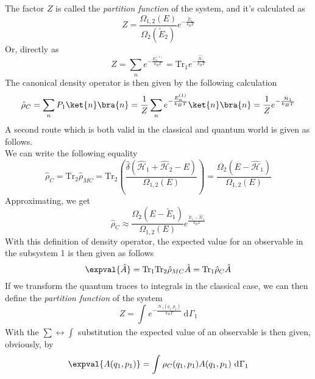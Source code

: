 \documentclass[a4paper, 11pt]{book}
\renewcommand{\trace}{\mathrm{Tr}}
\newcommand{\1}{\opr{\mathds{1}}}
\newcommand{\diff}[2][]{\ \mathrm{d}^{#1}#2}
\newcommand{\ham}{\mathcal{H}}
\newcommand{\opr}[1]{\hat{#1}}
\newcommand{\dopr}{\hat{\rho}}
\theoremstyle{plain}
\begin{document}
		The factor $Z$ is called the \textit{partition function} of the system, and it's calculated as
		\begin{equation*}
			Z=\frac{\Omega_{1,2}(E)}{\Omega_2(\tilde{E}_2)}e^{-\frac{\tilde{E}_1}{k_BT}}
		\end{equation*}
		Or, directly as
		\begin{equation}
			Z=\sum_ne^{-\frac{E_n^{(1)}}{k_BT}}=\trace_1e^{-\frac{\opr{\ham}_1}{k_BT}}
			\label{eq:canonicalpartitionfunction}
		\end{equation}
		The canonical density operator is then given by the following calculation
		\begin{equation}
			\dopr_C=\sum_nP_1\ket{n}\bra{n}=\frac{1}{Z}\sum_ne^{-\frac{E_n^{(1)}}{k_BT}}\ket{n}\bra{n}=\frac{1}{Z}e^{-\frac{\opr{\ham}_1}{k_BT}}
			\label{eq:canonicaldensityoperator}
		\end{equation}
		A second route which is both valid in the classical and quantum world is given as follows.\\
		We can write the following equality
		\begin{equation}
			\dopr_C=\trace_2\dopr_{MC}=\trace_2\left( \frac{\opr{\delta}\left( \opr{\ham}_1+\opr{\ham}_2-E \right)}{\Omega_{1,2}(E)} \right)=\frac{\Omega_2(E-\opr{\ham}_1)}{\Omega_{1,2}(E)}
			\label{eq:canonicaloperator}
		\end{equation}
		Approximating, we get
		\begin{equation}
			\dopr_C\approx\frac{\Omega_2(E-\tilde{E}_1)}{\Omega_{1,2}(E)}e^{\frac{\tilde{E}_1-\opr{\ham}_1}{k_BT}}
			\label{eq:canonicaloperatorapprox}
		\end{equation}
		With this definition of density operator, the expected value for an observable in the subsystem 1 is then given as follows
		\begin{equation}
			\expval{\opr{A}}=\trace_1\trace_2\dopr_{MC}\opr{A}=\trace_1\dopr_C\opr{A}
			\label{eq:expvalcanonical}
		\end{equation}
		If we transform the quantum traces to integrals in the classical case, we can then define the \textit{partition function} of the system
		\begin{equation}
			Z=\int_{}^{}e^{-\frac{\ham_1(q_1,p_1)}{k_BT}}\diff{\Gamma_1}
			\label{eq:partitionfunction}
		\end{equation}
		With the $\sum\leftrightarrow\int$ substitution the expected value of an observable is then given, obviously, by
		\begin{equation}
			\expval{A(q_1,p_1)}=\int_{}^{}\rho_C(q_1,p_1)A(q_1,p_1)\diff{\Gamma_1}
			\label{eq:expectedvalue}
		\end{equation}
\end{document}
